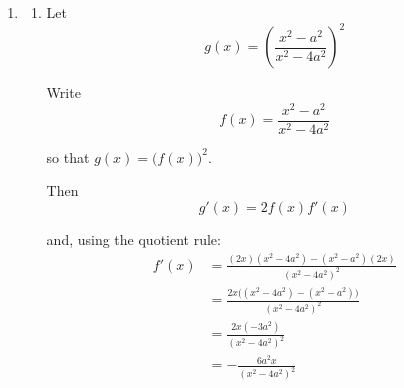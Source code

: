 \documentclass[leqno]{article}
\begin{document}
\begin{enumerate}[
  label=\textbf{\arabic*.},
  leftmargin=*,
  topsep=0pt,
  partopsep=0pt,
  parsep=0pt
]
\begin{djsSolution}
\begin{enumerate}[label=\textbf{(\alph*)}]
  
  Since the equation involves only $x^2$, $C_1$ is even, so it is symmetric about the $y$-axis.

  The denominator is zero when \(x=\pm 2a\), so the vertical asymptotes are
  \[
  x=\pm 2a
  \]

  The numerator and denominator have the same degree, so \(y\to\) the ratio of the leading coefficients as \(x\to\pm\infty\). The horizontal asymptote is
  \[
  y=1
  \]

  The intercepts are:
  \[
  y=0\quad\Longrightarrow\quad x^2-a^2=0\quad\Longrightarrow\quad x=\pm a
  \]

  so $(\pm a,0)$, and
  \[
  x=0\quad\Longrightarrow\quad y=\frac{-a^2}{-4a^2}=\frac14
  \]

  so $(0,\tfrac14)$.

  \item 
  \begin{enumerate}[label=(\roman*)]
    \item Let
    \[
    g(x)=\left(\frac{x^2-a^2}{x^2-4a^2}\right)^2
    \]

    Write
    \[
    f(x)=\frac{x^2-a^2}{x^2-4a^2}
    \]

    so that $g(x)=\bigl(f(x)\bigr)^2$.

    Then
    \[
    g'(x)=2f(x)f'(x)
    \]

    and, using the quotient rule:
    \begin{align*}
    f'(x)
    &=\frac{(2x)(x^2-4a^2)-(x^2-a^2)(2x)}{(x^2-4a^2)^2} \\
    &=\frac{2x\bigl((x^2-4a^2)-(x^2-a^2)\bigr)}{(x^2-4a^2)^2} \\
    &=\frac{2x(-3a^2)}{(x^2-4a^2)^2} \\
    &=-\frac{6a^2x}{(x^2-4a^2)^2}
    \end{align*}


\end{enumerate}
\end{enumerate}
\end{djsSolution}
\end{enumerate}
\end{document}
